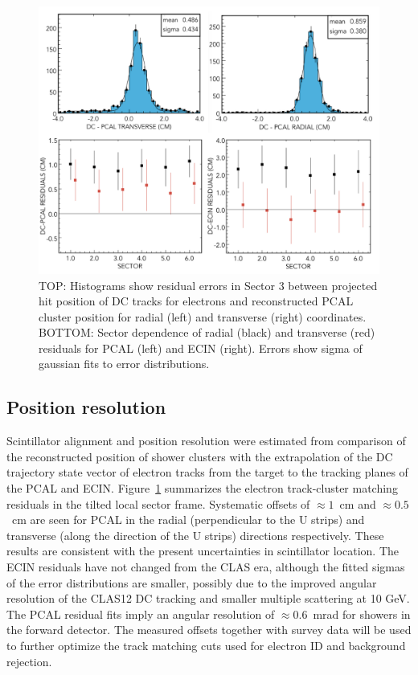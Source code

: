 \begin{figure}[t]
\centering
\includegraphics[width=1.0\columnwidth,keepaspectratio]{img/S10_1_3.png}
\caption[]{TOP: Histograms show residual errors in Sector 3 between projected hit position of DC tracks for electrons and reconstructed PCAL cluster position for radial (left) and transverse (right) coordinates. BOTTOM: Sector dependence of radial (black) and transverse (red) residuals for PCAL (left) and ECIN (right).  Errors show sigma of gaussian fits to error distributions.}
\label{fig:S10_1_3}
\end{figure}

\subsection{Position resolution}
Scintillator alignment and position resolution were estimated from comparison of the reconstructed position of shower clusters with the extrapolation of the DC trajectory state vector of electron tracks from the target to the tracking planes of the PCAL and ECIN.  
Figure~\ref{fig:S10_1_3} summarizes the electron track-cluster matching residuals in the tilted local sector frame.   Systematic offsets of $\approx 1$~cm and $\approx 0.5$ ~cm are seen for PCAL in the radial (perpendicular to the U strips) and transverse (along the direction of the U strips) directions respectively.  These results are consistent with the present uncertainties in scintillator location. The ECIN residuals have not changed from the CLAS era, although the fitted sigmas of the error distributions are smaller, possibly due to the improved angular resolution of the CLAS12 DC tracking and smaller multiple scattering at 10 GeV.  The PCAL residual fits imply an angular resolution of $\approx 0.6$~mrad for showers in the forward detector.  The measured offsets together with survey data will be used to further optimize the track matching cuts used for electron ID and background rejection. 

